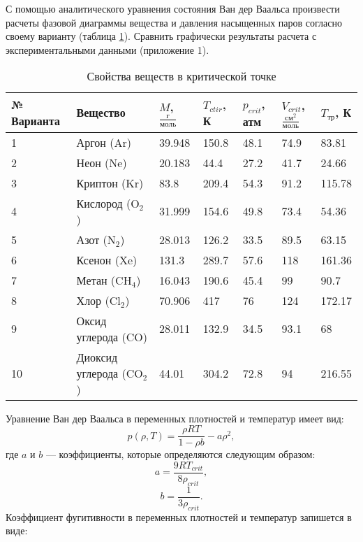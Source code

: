 С помощью аналитического уравнения состояния Ван дер Ваальса произвести расчеты фазовой диаграммы вещества и давления насыщенных паров согласно своему варианту (таблица \ref{tab:eos.task}). Сравнить графически результаты расчета с экспериментальными данными (приложение 1).
\begin{table}
	\caption{Свойства веществ в критической точке}
	\label{tab:eos.task}
	\begin{tabularx}{\textwidth}%
		{|p{}
		|p{}
		|X
		|X
		|X
		|X
		|X|
		}
		\hline
		№ Варианта & Вещество  & $M$, $\frac{г}{моль}$  & $T_{ctir}$, К  & $p_{crit}$, атм  & $V_{crit}$, ${\frac{см^2}{моль}}$ & $T_{тр}$, К  \\ \hline \hline
		1 & Аргон (Ar)  & 39.948  & 150.8 & 48.1 & 74.9 & 83.81 \\ \hline
		2 & Неон (Ne) & 20.183 & 44.4 & 27.2 & 41.7 & 24.66 \\ \hline
		3 & Криптон (Kr) & 83.8 & 209.4 & 54.3 & 91.2 & 115.78 \\ \hline
		4 & Кислород ($\mathrm{O_2}$) & 31.999 & 154.6 & 49.8 & 73.4 & 54.36\\ \hline
		5 & Азот ($\mathrm{N_2}$) & 28.013 & 126.2 & 33.5 & 89.5 & 63.15 \\ \hline
		6 & Ксенон (Xe) & 131.3 & 289.7 & 57.6 & 118 & 161.36 \\ \hline
		7 & Метан ($\mathrm{CH_4}$) & 16.043 & 190.6 & 45.4 & 99 & 90.7 \\ \hline
		8 & Хлор ($\mathrm{Cl_2}$) & 70.906 & 417 & 76 & 124 & 172.17 \\ \hline
		9 & Оксид углерода (CO) & 28.011 & 132.9 & 34.5 & 93.1 & 68 \\ \hline
		10 & Диоксид углерода ($\mathrm{CO_2}$) &44.01 & 304.2 & 72.8 & 94 &	216.55 \\ \hline
	\end{tabularx}
\end{table}
	
	Уравнение Ван дер Ваальса в переменных плотностей и температур имеет вид:
	\begin{equation*}
		p(\rho,T)=\dfrac{\rho R T}{1-\rho b} - a \rho^2,
	\end{equation*}
	где $a$ и $b$ --- коэффициенты, которые определяются следующим образом:
	\begin{equation*}
		a=\dfrac{9 R T_{crit}}{8 \rho_{crit}},
	\end{equation*}
	\begin{equation*}
		b=\dfrac{1}{3 \rho_{crit}}.
	\end{equation*}
	Коэффициент фугитивности в переменных плотностей и температур запишется в виде:
	

